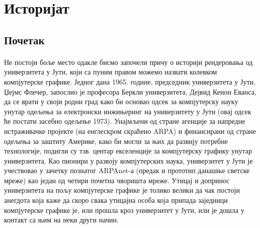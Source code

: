 \documentclass[12pt]{article}
\begin{document}
	\section{Историјат}
	
	\subsection{Почетак}
	\paragraph{}
	Не постоји боље место одакле бисмо започели причу о историји рендеровања од универзитета у Јути, који са пуним правом можемо назвати колевком компјутерске графике. Једног дана 1965. године, председник универзитета у Јути, Џејмс Флечер, запослио је професора Беркли универзитета, Дејвид Кенон Еванса, да се врати у своји родни град како би основао одсек за компјутерску науку унутар одељења за електронски инжињеринг на универзитету у Јути (овај одсек ће постати засебно одељење 1973). Унајмљени од стране агенције за напредне истраживачке пројекте (на енглескром скраћено ARPA) и финансирани од стране одељења за заштиту Америке, како би могли за њих да развију потребне технологије, подигли су тзв. центар екселенције за компјутерску графику унутар универзитета. Као пионири у развоју компјутерских наука, универзитет у Јути је учествовао у зачетку познатог ARPAnet-а (предак и прототип данашње светске мреже) као један од четири почетна чворишта мреже. Утицај и допринос универзитета на пољу компјутерске графике је толико велики да чак постоји анегдота која каже да скоро свака утицајна особа која припада заједници компјутерске графике је, или прошла кроз универзитет у Јути, или је дошла у контакт са њим на неки други начин.
	
\end{document}

